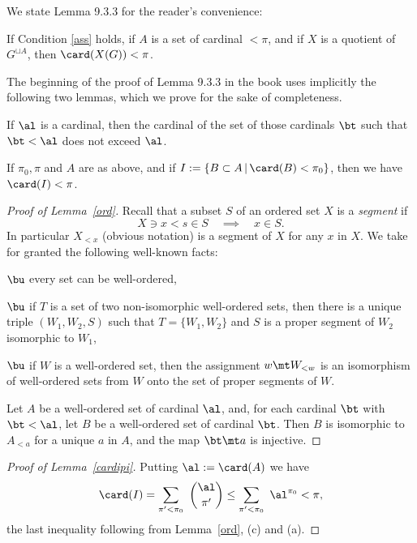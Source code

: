 \documentclass[12pt]{article}
\theoremstyle{remark}
\theoremstyle{definition}
\begin{document}
We state Lemma 9.3.3 for the reader's convenience:

\begin{lem}[Lemma 9.3.3 p.~226]
If Condition \ref{ass} holds, if $A$ is a set of cardinal $<\pi$, and if $X$ is a quotient of $G^{\sqcup A}$, then $\card(X(G))<\pi$.
\end{lem}

The beginning of the proof of Lemma 9.3.3 in the book uses implicitly the following two lemmas, which we prove for the sake of completeness. 

\begin{lem}
If $\al$ is a cardinal, then the cardinal of the set of those cardinals $\bt$ such that $\bt<\al$ does not exceed $\al$.
\end{lem} 

\begin{lem}
If $\pi_0,\pi$ and $A$ are as above, and if $I:=\{B\subset A\,|\,\card(B)<\pi_0\}$, then we have $\card(I)<\pi$. 
\end{lem} 

\begin{proof}[Proof of Lemma~\ref{ord}]
Recall that a subset $S$ of an ordered set $X$ is a {\em segment} if 
$$
X\ni x<s\in S\quad\implies\quad x\in S.
$$ 
In particular $X_{<x}$ (obvious notation) is a segment of $X$ for any $x$ in $X$. We take for granted the following well-known facts:

\nn$\bu$ every set can be well-ordered,

\nn$\bu$ if $T$ is a set of two non-isomorphic well-ordered sets, then there is a unique triple $(W_1,W_2,S)$ such that $T=\{W_1,W_2\}$ and $S$ is a proper segment of $W_2$ isomorphic to $W_1$,

\nn$\bu$ if $W$ is a well-ordered set, then the assignment $w\mt W_{<w}$ is an isomorphism of well-ordered sets from $W$ onto the set of proper segments of $W$.

Let $A$ be a well-ordered set of cardinal $\al$, and, for each cardinal $\bt$ with $\bt<\al$, let $B$ be a well-ordered set of cardinal $\bt$. Then $B$ is isomorphic to $A_{<a}$ for a unique $a$ in $A$, and the map $\bt\mt a$ is injective.
\end{proof} 

\begin{proof}[Proof of Lemma~\ref{cardipi}] 
Putting $\al:=\card(A)$ we have
$$
\card(I)=\sum_{\pi'<\pi_0}\ \binom{\al}{\pi'}\le\sum_{\pi'<\pi_0}\ \al^{\pi_0}<\pi,
$$ 
the last inequality following from Lemma~\ref{ord}, (c) and (a). 
\end{proof} 
\end{document}
